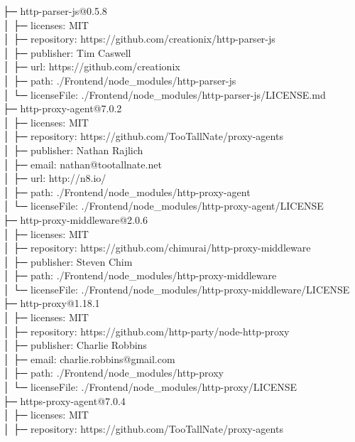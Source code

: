 ├─ http-parser-js@0.5.8\\
│  ├─ licenses: MIT\\
│  ├─ repository: https://github.com/creationix/http-parser-js\\
│  ├─ publisher: Tim Caswell\\
│  ├─ url: https://github.com/creationix\\
│  ├─ path: ./Frontend/node\_modules/http-parser-js\\
│  └─ licenseFile: ./Frontend/node\_modules/http-parser-js/LICENSE.md\\
├─ http-proxy-agent@7.0.2\\
│  ├─ licenses: MIT\\
│  ├─ repository: https://github.com/TooTallNate/proxy-agents\\
│  ├─ publisher: Nathan Rajlich\\
│  ├─ email: nathan@tootallnate.net\\
│  ├─ url: http://n8.io/\\
│  ├─ path: ./Frontend/node\_modules/http-proxy-agent\\
│  └─ licenseFile: ./Frontend/node\_modules/http-proxy-agent/LICENSE\\
├─ http-proxy-middleware@2.0.6\\
│  ├─ licenses: MIT\\
│  ├─ repository: https://github.com/chimurai/http-proxy-middleware\\
│  ├─ publisher: Steven Chim\\
│  ├─ path: ./Frontend/node\_modules/http-proxy-middleware\\
│  └─ licenseFile: ./Frontend/node\_modules/http-proxy-middleware/LICENSE\\
├─ http-proxy@1.18.1\\
│  ├─ licenses: MIT\\
│  ├─ repository: https://github.com/http-party/node-http-proxy\\
│  ├─ publisher: Charlie Robbins\\
│  ├─ email: charlie.robbins@gmail.com\\
│  ├─ path: ./Frontend/node\_modules/http-proxy\\
│  └─ licenseFile: ./Frontend/node\_modules/http-proxy/LICENSE\\
├─ https-proxy-agent@7.0.4\\
│  ├─ licenses: MIT\\
│  ├─ repository: https://github.com/TooTallNate/proxy-agents\\
